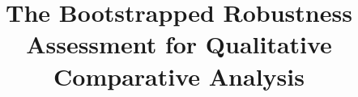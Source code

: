 \documentclass[12pt]{article}
\title{{The Bootstrapped Robustness Assessment for Qualitative Comparative Analysis}}
\begin{document}
\maketitle
\doublespace
\newpage


\newpage
\end{document}
